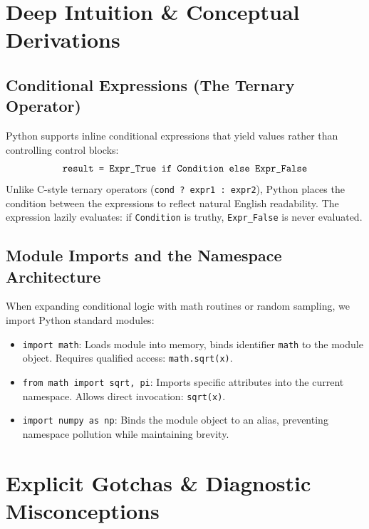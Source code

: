 \section{Deep Intuition \& Conceptual Derivations}

\subsection{Conditional Expressions (The Ternary Operator)}
Python supports inline conditional expressions that yield values rather than controlling control blocks:
\begin{equation}
\text{\texttt{result = Expr\_True if Condition else Expr\_False}}
\end{equation}
Unlike C-style ternary operators (\texttt{cond ? expr1 : expr2}), Python places the condition between the expressions to reflect natural English readability. The expression lazily evaluates: if \texttt{Condition} is truthy, \texttt{Expr\_False} is never evaluated.

\subsection{Module Imports and the Namespace Architecture}
When expanding conditional logic with math routines or random sampling, we import Python standard modules:
\begin{itemize}
    \item \texttt{import math}: Loads module into memory, binds identifier \texttt{math} to the module object. Requires qualified access: \texttt{math.sqrt(x)}.
    \item \texttt{from math import sqrt, pi}: Imports specific attributes into the current namespace. Allows direct invocation: \texttt{sqrt(x)}.
    \item \texttt{import numpy as np}: Binds the module object to an alias, preventing namespace pollution while maintaining brevity.
\end{itemize}

\section{Explicit Gotchas \& Diagnostic Misconceptions}

